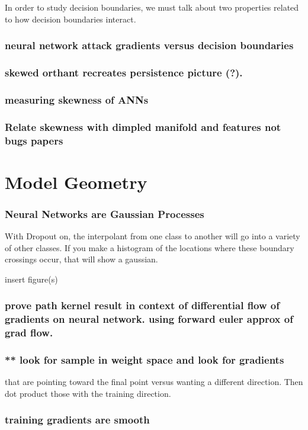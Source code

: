\documentclass[10pt]{extarticle}
\begin{document}
In order to study decision boundaries, we must talk about two
properties related to how decision boundaries interact. 

\section{neural network attack gradients versus decision boundaries}

\section{skewed orthant recreates persistence picture (?). }
\section{measuring skewness of ANNs}
\section{Relate skewness with dimpled manifold and features not bugs papers}

\part{Model Geometry}
\section{Neural Networks are Gaussian Processes}
With Dropout on, the interpolant from one class to another will go into a variety of other classes. If you make a histogram of the locations where these boundary crossings occur, that will show a gaussian. 

insert figure(s)

\section{prove path kernel result in context of differential flow of
gradients on neural network. using forward euler approx of grad flow. }

\section{** look for sample in weight space and look for gradients}
  that are pointing toward the final point versus wanting a different
  direction. Then dot product those with the training direction. 

\section{training gradients are smooth}
\end{document}
